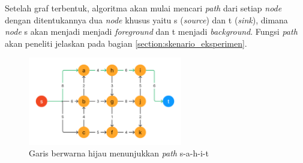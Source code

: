 

Setelah graf terbentuk, algoritma akan mulai mencari \emph{path} dari setiap \emph{node}
dengan ditentukannya dua \emph{node} khusus yaitu s (\emph{source}) dan t (\emph{sink}), 
dimana \emph{node} s akan menjadi  menjadi \emph{foreground} dan t menjadi \emph{background}.
Fungsi \emph{path} akan peneliti jelaskan pada bagian \ref{section:skenario_eksperimen}.

\begin{figure}[H]
	\centering{}
	\includegraphics[width=0.6\textwidth]{gambar/contoh_path.png}
	\caption{Garis berwarna hijau menunjukkan \emph{path} s-a-h-i-t}
\end{figure}







